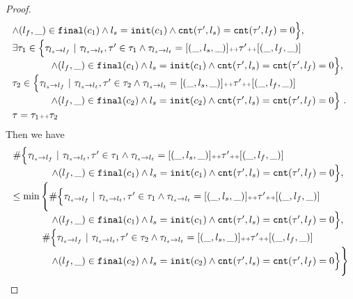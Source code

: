 \begin{proof}
\[\begin{array}{l}
    \land (l_{f}, \_) \in \mathtt{final}(c_1)
    \land l_s = \mathtt{init}(c_1)
    \land \mathtt{cnt}(\mathtt{\tau}', l_s) = \mathtt{cnt}(\mathtt{\tau}', l_f) = 0 
    \Big\},
    \\
    \exists \mathtt{\tau}_1 \in
     \Big\{\mathtt{\tau}_{l_s \to l_f} ~\vert~ \mathtt{\tau}_{l_s \to l_t}, \mathtt{\tau}' \in \mathtt{\tau}_1 \land \mathtt{\tau}_{l_s \to l_t} = [(\_, l_s, \_)] {\scriptscriptstyle ++} \mathtt{\tau}' {\scriptscriptstyle ++} [(\_, l_f, \_)]
    \\ \qquad \qquad
    \land (l_{f}, \_) \in \mathtt{final}(c_1)
    \land l_s = \mathtt{init}(c_1)
    \land \mathtt{cnt}(\mathtt{\tau}', l_s) = \mathtt{cnt}(\mathtt{\tau}', l_f) = 0 
    \Big\},
    \\
    \mathtt{\tau}_2 \in
    \Big\{\mathtt{\tau}_{l_s \to l_f} ~\vert~ \mathtt{\tau}_{l_s \to l_t}, \mathtt{\tau}' \in \mathtt{\tau}_2 \land \mathtt{\tau}_{l_s \to l_t} = [(\_, l_s, \_)] {\scriptscriptstyle ++} \mathtt{\tau}' {\scriptscriptstyle ++} [(\_, l_f, \_)]
   \\ \qquad \qquad
   \land (l_{f}, \_) \in \mathtt{final}(c_2)
   \land l_s = \mathtt{init}(c_2)
   \land \mathtt{cnt}(\mathtt{\tau}', l_s) = \mathtt{cnt}(\mathtt{\tau}', l_f) = 0 
   \Big\} 
   ~.~ 
   \\
   \mathtt{\tau} = \mathtt{\tau}_1 {\scriptscriptstyle ++} \mathtt{\tau}_2
    \end{array}
  \]
  Then we have
  \[
    \begin{array}{l}
      \# \Big\{\mathtt{\tau}_{l_s \to l_f} ~\vert~ \mathtt{\tau}_{l_s \to l_t}, \mathtt{\tau}' \in \mathtt{\tau}_1 \land \mathtt{\tau}_{l_s \to l_t} = [(\_, l_s, \_)] {\scriptscriptstyle ++} \mathtt{\tau}' {\scriptscriptstyle ++} [(\_, l_f, \_)]
      \\ \qquad \qquad
      \land (l_{f}, \_) \in \mathtt{final}(c_1)
      \land l_s = \mathtt{init}(c_1)
      \land \mathtt{cnt}(\mathtt{\tau}', l_s) = \mathtt{cnt}(\mathtt{\tau}', l_f) = 0 
      \Big\},
      \\
      \leq 
      \min \Bigg\{ \#
       \Big\{\mathtt{\tau}_{l_s \to l_f} ~\vert~ \mathtt{\tau}_{l_s \to l_t}, \mathtt{\tau}' \in \mathtt{\tau}_1 \land \mathtt{\tau}_{l_s \to l_t} = [(\_, l_s, \_)] {\scriptscriptstyle ++} \mathtt{\tau}' {\scriptscriptstyle ++} [(\_, l_f, \_)]
      \\ \qquad \qquad
      \land (l_{f}, \_) \in \mathtt{final}(c_1)
      \land l_s = \mathtt{init}(c_1)
      \land \mathtt{cnt}(\mathtt{\tau}', l_s) = \mathtt{cnt}(\mathtt{\tau}', l_f) = 0 
      \Big\},
      \\ \qquad \quad
      \#
      \Big\{\mathtt{\tau}_{l_s \to l_f} ~\vert~ \mathtt{\tau}_{l_s \to l_t}, \mathtt{\tau}' \in \mathtt{\tau}_2 \land \mathtt{\tau}_{l_s \to l_t} = [(\_, l_s, \_)] {\scriptscriptstyle ++} \mathtt{\tau}' {\scriptscriptstyle ++} [(\_, l_f, \_)]
     \\ \qquad \qquad
     \land (l_{f}, \_) \in \mathtt{final}(c_2)
     \land l_s = \mathtt{init}(c_2)
     \land \mathtt{cnt}(\mathtt{\tau}', l_s) = \mathtt{cnt}(\mathtt{\tau}', l_f) = 0 
     \Big\} 
     \Bigg\}

\end{array}\]
\end{proof}
